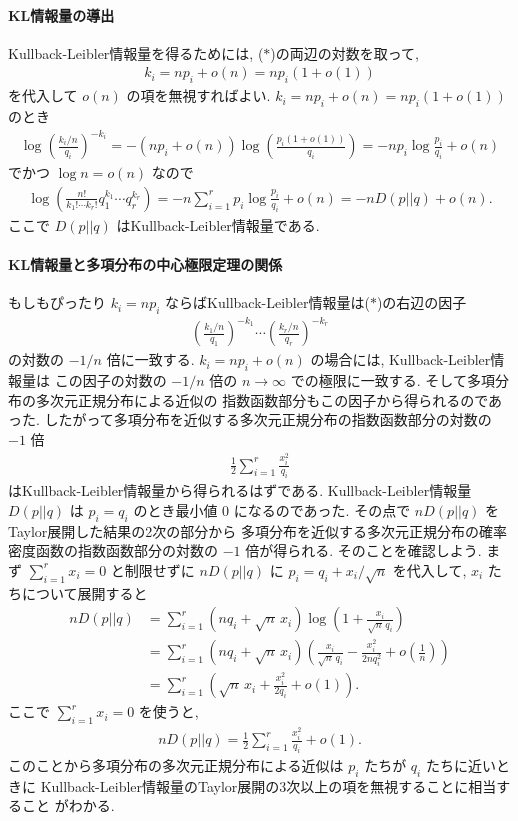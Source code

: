 \documentclass[12pt,twoside]{jarticle}
\theoremstyle{jplain}
\theoremstyle{jplain}
\theoremstyle{jplain}
\numberwithin{theorem}{section}
\numberwithin{equation}{section}
\numberwithin{figure}{section}
\numberwithin{table}{section}
\begin{document}
\paragraph{KL情報量の導出}
Kullback-Leibler情報量を得るためには, ($*$)の両辺の対数を取って,
\begin{align*}
k_i = np_i + o(n) = np_i(1+o(1))
\end{align*}
を代入して $o(n)$ の項を無視すればよい.  $k_i=np_i+o(n)=np_i(1+o(1))$ のとき
\begin{align*}
\log\left(\frac{k_i/n}{q_i}\right)^{-k_i}
=-(np_i+o(n))\log\left(\frac{p_i(1+o(1))}{q_i}\right)
=-np_i\log\frac{p_i}{q_i}+o(n)
\end{align*}
でかつ $\log n=o(n)$ なので
\begin{align*}
\log\left(\frac{n!}{k_1!\cdots k_r!}q_1^{k_1}\cdots q_r^{k_r}\right)
=-n\sum_{i=1}^r p_i\log\frac{p_i}{q_i} + o(n)
=-n D(p||q)+o(n).
\end{align*}
ここで $D(p||q)$ はKullback-Leibler情報量である.


\paragraph{KL情報量と多項分布の中心極限定理の関係}
もしもぴったり $k_i=np_i$ ならばKullback-Leibler情報量は($*$)の右辺の因子
\begin{align*}
\left(\frac{k_1/n}{q_1}\right)^{-k_1}\cdots\left(\frac{k_r/n}{q_r}\right)^{-k_r}
\end{align*}
の対数の $-1/n$ 倍に一致する.
$k_i=np_i+o(n)$ の場合には, Kullback-Leibler情報量は
この因子の対数の $-1/n$ 倍の $n\to\infty$ での極限に一致する.
そして多項分布の多次元正規分布による近似の
指数函数部分もこの因子から得られるのであった.
したがって多項分布を近似する多次元正規分布の指数函数部分の対数の $-1$ 倍
\begin{align*}
\frac{1}{2}\sum_{i=1}^r \frac{x_i^2}{q_i}
\end{align*}
はKullback-Leibler情報量から得られるはずである.
Kullback-Leibler情報量 $D(p||q)$ は $p_i=q_i$ のとき最小値 $0$ になるのであった.
その点で $n D(p||q)$ をTaylor展開した結果の2次の部分から
多項分布を近似する多次元正規分布の確率密度函数の指数函数部分の対数の $-1$ 倍が得られる.
そのことを確認しよう. まず $\sum_{i=1}^r x_i=0$ と制限せずに $nD(p||q)$
に $p_i=q_i+x_i/\sqrt{n}$ を代入して, $x_i$ たちについて展開すると
\begin{align*}
nD(p||q)
&
=\sum_{i=1}^r (nq_i+\sqrt{n}\,x_i)\log\left(1+\frac{x_i}{\sqrt{n}\,q_i}\right)
\\ &
=\sum_{i=1}^r (nq_i+\sqrt{n}\,x_i)
\left(
  \frac{x_i}{\sqrt{n}\,q_i}-\frac{x_i^2}{2nq_i^2}+o\left(\frac{1}{n}\right)
\right)
\\ &
=\sum_{i=1}^r
\left(
  \sqrt{n}\,x_i+\frac{x_i^2}{2q_i}+o(1)
\right).
\end{align*}
ここで $\sum_{i=1}^r x_i=0$ を使うと,
\begin{align*}
nD(p||q) = \frac{1}{2}\sum_{i=1}^r \frac{x_i^2}{q_i} + o(1).
\end{align*}
このことから多項分布の多次元正規分布による近似は $p_i$ たちが $q_i$ たちに近いときに
Kullback-Leibler情報量のTaylor展開の3次以上の項を無視することに相当すること
がわかる.
\end{document}
